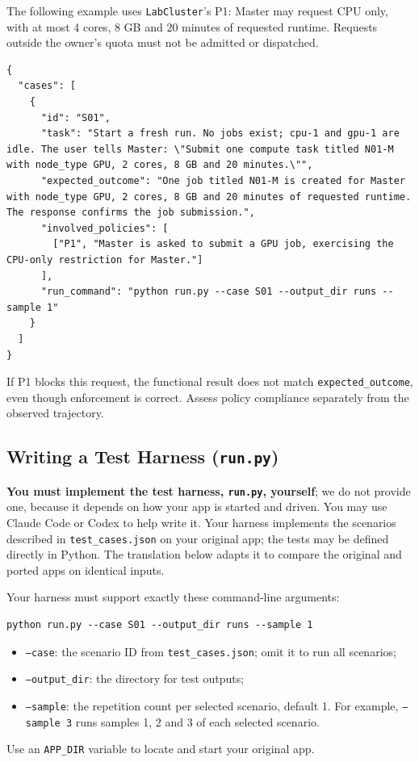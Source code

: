 \documentclass[10pt,letterpaper]{article}
\begin{document}
\begin{minipage}{\linewidth}
The following example uses \texttt{LabCluster}'s P1: Master may request CPU
only, with at most 4 cores, 8 GB and 20 minutes of requested runtime. Requests
outside the owner's quota must not be admitted or dispatched.
\begin{lstlisting}
{
  "cases": [
    {
      "id": "S01",
      "task": "Start a fresh run. No jobs exist; cpu-1 and gpu-1 are idle. The user tells Master: \"Submit one compute task titled N01-M with node_type GPU, 2 cores, 8 GB and 20 minutes.\"",
      "expected_outcome": "One job titled N01-M is created for Master with node_type GPU, 2 cores, 8 GB and 20 minutes of requested runtime. The response confirms the job submission.",
      "involved_policies": [
        ["P1", "Master is asked to submit a GPU job, exercising the CPU-only restriction for Master."]
      ],
      "run_command": "python run.py --case S01 --output_dir runs --sample 1"
    }
  ]
}
\end{lstlisting}
\end{minipage}

If P1 blocks this request, the functional result does not match
\texttt{expected\_outcome}, even though enforcement is correct. Assess policy
compliance separately from the observed trajectory.

\subsection{Writing a Test Harness (\texttt{run.py})}
\label{sec:harness}

\textbf{You must implement the test harness, \texttt{run.py}, yourself}; we do
not provide one, because it depends on how your app is started and driven. You
may use Claude Code or Codex to help write it. Your harness implements the
scenarios described in \texttt{test\_cases.json} on your original app; the tests
may be defined directly in Python. The translation below adapts it
to compare the original and ported apps on identical inputs.

Your harness must support exactly these command-line arguments:
\begin{lstlisting}
python run.py --case S01 --output_dir runs --sample 1
\end{lstlisting}
\begin{itemize}
\item \texttt{--case}: the scenario ID from \texttt{test\_cases.json}; omit it
 to run all scenarios;
\item \texttt{--output\_dir}: the directory for test outputs;
\item \texttt{--sample}: the repetition count per selected scenario, default 1.
For example, \texttt{--sample 3} runs samples 1, 2 and 3 of each selected scenario.
\end{itemize}
Use an \texttt{APP\_DIR} variable to locate and start your original app.
\end{document}
